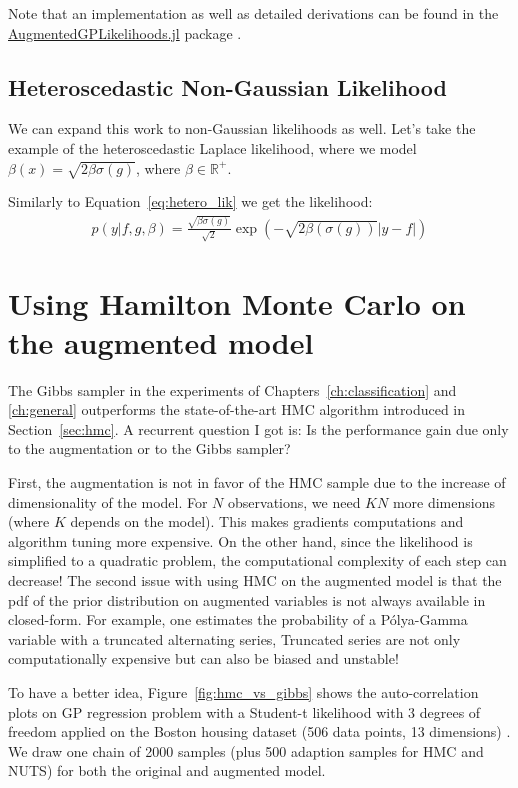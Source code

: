 Note that an implementation as well as detailed derivations can be found in the \href{https://github.com/JuliaGaussianProcesses/AugmentedGPLikelihoods.jl}{AugmentedGPLikelihoods.jl} package \cite{theo_galy_fajou_2022_6347022}.
\subsection{Heteroscedastic Non-Gaussian Likelihood}

We can expand this work to non-Gaussian likelihoods as well.
Let's take the example of the heteroscedastic Laplace likelihood, where we model $\beta(x) = \sqrt{2\beta \sigma(g)}$, where $\beta \in \mathbb{R}^+$.

Similarly to Equation~\ref{eq:hetero_lik} we get the likelihood:
\begin{align*}
    p(y|f,g,\beta) = \frac{\sqrt{\beta\sigma(g)}}{\sqrt{2}}\exp\left(-\sqrt{2\beta(\sigma(g))}|y-f|\right)
    \label{eq:hetero_lik_laplace}
\end{align*}

\section{Using Hamilton Monte Carlo on the augmented model}

The Gibbs sampler in the experiments of Chapters~\ref{ch:classification} and \ref{ch:general} outperforms the state-of-the-art \ac{HMC} algorithm introduced in Section~\ref{sec:hmc}.
A recurrent question I got is:
Is the performance gain due only to the augmentation or to the Gibbs sampler?

First, the augmentation is not in favor of the \ac{HMC} sample due to the increase of dimensionality of the model.
For $N$ observations, we need $KN$ more dimensions (where $K$ depends on the model).
This makes gradients computations and algorithm tuning more expensive.
On the other hand, since the likelihood is simplified to a quadratic problem, the computational complexity of each step can decrease!
The second issue with using \ac{HMC} on the augmented model is that the \ac{pdf} of the prior distribution on augmented variables is not always available in closed-form.
For example, one estimates the probability of a P\'olya-Gamma variable with a truncated alternating series,
Truncated series are not only computationally expensive but can also be biased and unstable!

To have a better idea, Figure~\ref{fig:hmc_vs_gibbs} shows the auto-correlation plots on \ac{GP} regression problem with a Student-t likelihood with 3 degrees of freedom applied on the Boston housing dataset (506 data points, 13 dimensions) \cite{harrison1978hedonic}.
We draw one chain of 2000 samples (plus 500 adaption samples for \ac{HMC} and \ac{NUTS}) for both the original and augmented model.

